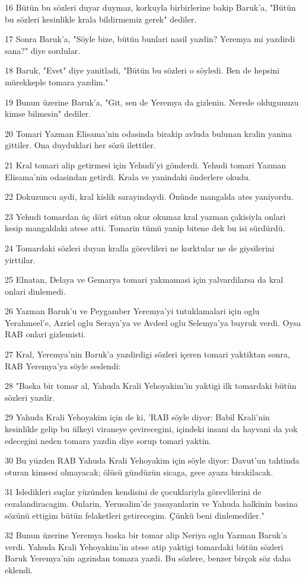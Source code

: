 \par 16 Bütün bu sözleri duyar duymaz, korkuyla birbirlerine bakip Baruk'a, "Bütün bu sözleri kesinlikle krala bildirmemiz gerek" dediler.
\par 17 Sonra Baruk'a, "Söyle bize, bütün bunlari nasil yazdin? Yeremya mi yazdirdi sana?" diye sordular.
\par 18 Baruk, "Evet" diye yanitladi, "Bütün bu sözleri o söyledi. Ben de hepsini mürekkeple tomara yazdim."
\par 19 Bunun üzerine Baruk'a, "Git, sen de Yeremya da gizlenin. Nerede oldugunuzu kimse bilmesin" dediler.
\par 20 Tomari Yazman Elisama'nin odasinda birakip avluda bulunan kralin yanina gittiler. Ona duyduklari her sözü ilettiler.
\par 21 Kral tomari alip getirmesi için Yehudi'yi gönderdi. Yehudi tomari Yazman Elisama'nin odasindan getirdi. Krala ve yanindaki önderlere okudu.
\par 22 Dokuzuncu aydi, kral kislik sarayindaydi. Önünde mangalda ates yaniyordu.
\par 23 Yehudi tomardan üç dört sütun okur okumaz kral yazman çakisiyla onlari kesip mangaldaki atese atti. Tomarin tümü yanip bitene dek bu isi sürdürdü.
\par 24 Tomardaki sözleri duyan kralla görevlileri ne korktular ne de giysilerini yirttilar.
\par 25 Elnatan, Delaya ve Gemarya tomari yakmamasi için yalvardilarsa da kral onlari dinlemedi.
\par 26 Yazman Baruk'u ve Peygamber Yeremya'yi tutuklamalari için oglu Yerahmeel'e, Azriel oglu Seraya'ya ve Avdeel oglu Selemya'ya buyruk verdi. Oysa RAB onlari gizlemisti.
\par 27 Kral, Yeremya'nin Baruk'a yazdirdigi sözleri içeren tomari yaktiktan sonra, RAB Yeremya'ya söyle seslendi:
\par 28 "Baska bir tomar al, Yahuda Krali Yehoyakim'in yaktigi ilk tomardaki bütün sözleri yazdir.
\par 29 Yahuda Krali Yehoyakim için de ki, 'RAB söyle diyor: Babil Krali'nin kesinlikle gelip bu ülkeyi viraneye çevirecegini, içindeki insani da hayvani da yok edecegini neden tomara yazdin diye sorup tomari yaktin.
\par 30 Bu yüzden RAB Yahuda Krali Yehoyakim için söyle diyor: Davut'un tahtinda oturan kimsesi olmayacak; ölüsü gündüzün sicaga, gece ayaza birakilacak.
\par 31 Isledikleri suçlar yüzünden kendisini de çocuklariyla görevlilerini de cezalandiracagim. Onlarin, Yerusalim'de yasayanlarin ve Yahuda halkinin basina sözünü ettigim bütün felaketleri getirecegim. Çünkü beni dinlemediler."
\par 32 Bunun üzerine Yeremya baska bir tomar alip Neriya oglu Yazman Baruk'a verdi. Yahuda Krali Yehoyakim'in atese atip yaktigi tomardaki bütün sözleri Baruk Yeremya'nin agzindan tomara yazdi. Bu sözlere, benzer birçok söz daha eklendi.

